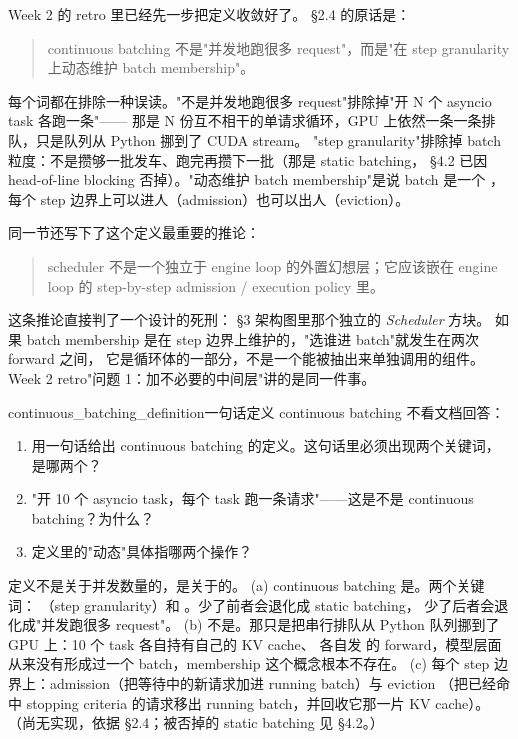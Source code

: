 Week 2 的 retro 里已经先一步把定义收敛好了。 §2.4 的原话是：

\begin{quote}
continuous batching 不是"并发地跑很多 request"，而是"在 step granularity 上动态维护 batch membership"。
\end{quote}

每个词都在排除一种误读。"不是并发地跑很多 request"排除掉"开 N 个 asyncio task 各跑一条"——
那是 N 份互不相干的单请求循环，GPU 上依然一条一条排队，只是队列从 Python 挪到了 CUDA stream。
"step granularity"排除掉 batch 粒度：不是攒够一批发车、跑完再攒下一批（那是 static batching，
 §4.2 已因 head-of-line blocking 否掉）。"动态维护 batch membership"是说 batch 是一个
，每个 step 边界上可以进人（admission）也可以出人（eviction）。

同一节还写下了这个定义最重要的推论：

\begin{quote}
scheduler 不是一个独立于 engine loop 的外置幻想层；它应该嵌在 engine loop 的
step-by-step admission / execution policy 里。
\end{quote}

这条推论直接判了一个设计的死刑： §3 架构图里那个独立的 \emph{Scheduler} 方块。
如果 batch membership 是在 step 边界上维护的，"选谁进 batch"就发生在两次 forward 之间，
它是循环体的一部分，不是一个能被抽出来单独调用的组件。
Week 2 retro"问题 1：加不必要的中间层"讲的是同一件事。

\begin{checkpoint}{continuous_batching_definition}{一句话定义 continuous batching}
不看文档回答：
\begin{enumerate}[label=(\alph*)]
  \item 用一句话给出 continuous batching 的定义。这句话里必须出现两个关键词，是哪两个？
  \item "开 10 个 asyncio task，每个 task 跑一条请求"——这是不是 continuous batching？为什么？
  \item 定义里的"动态"具体指哪两个操作？
\end{enumerate}
\hint 定义不是关于并发数量的，是关于的。
\ifshowanswers
\tcblower
\answer (a) continuous batching 是。两个关键词：
（step granularity）和 。少了前者会退化成 static batching，
少了后者会退化成"并发跑很多 request"。
(b) 不是。那只是把串行排队从 Python 队列挪到了 GPU 上：10 个 task 各自持有自己的 KV cache、
各自发 \code{[1, 1]} 的 forward，模型层面从来没有形成过一个 batch，membership 这个概念根本不存在。
(c) 每个 step 边界上：admission（把等待中的新请求加进 running batch）与 eviction
（把已经命中 stopping criteria 的请求移出 running batch，并回收它那一片 KV cache）。
\whereincode （尚无实现，依据  §2.4；被否掉的 static batching
见  §4.2。）
\fi
\end{checkpoint}

